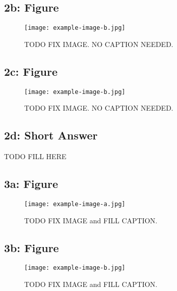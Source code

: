 \documentclass[10pt]{article}
\begin{document}
\subsection{2b: Figure}
\renewcommand{\figurename}{Fig.}
\renewcommand{\thefigure}{2b}
 \begin{figure}[!h]
     \centering
     \texttt{[image: example-image-b.jpg]}
     \label{fig:2b}
\caption{
TODO FIX IMAGE. NO CAPTION NEEDED.
}%
 \end{figure}

\newpage 


\subsection{2c: Figure}
\renewcommand{\figurename}{Fig.}
\renewcommand{\thefigure}{2c}
 \begin{figure}[!h]
     \centering
     \texttt{[image: example-image-b.jpg]}
     \label{fig:2c}
\caption{
TODO FIX IMAGE. NO CAPTION NEEDED.
}%
 \end{figure}
 
\subsection{2d: Short Answer}

TODO FILL HERE

\newpage

\subsection{3a: Figure}
\renewcommand{\figurename}{Fig.}
\renewcommand{\thefigure}{3a}
 \begin{figure}[!h]
     \centering
     \texttt{[image: example-image-a.jpg]}
     \label{fig:3a}
\caption{
TODO FIX IMAGE and FILL CAPTION.
}%
 \end{figure}

\subsection{3b: Figure}
\renewcommand{\figurename}{Fig.}
\renewcommand{\thefigure}{3b}
 \begin{figure}[!h]
     \centering
     \texttt{[image: example-image-b.jpg]}
     \label{fig:3b}
\caption{
TODO FIX IMAGE and FILL CAPTION.
}%
 \end{figure}
\end{document}
